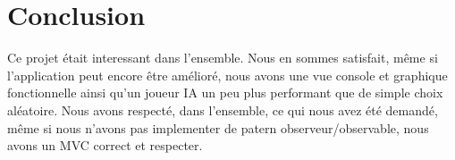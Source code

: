 \chapter{Conclusion}

	Ce projet était interessant dans l'ensemble. Nous en sommes satisfait, même si l'application peut encore être amélioré, nous avons une vue console et graphique fonctionnelle ainsi qu'un joueur IA un peu plus performant que de simple choix aléatoire.
    Nous avons respecté, dans l'ensemble, ce qui nous avez été demandé, même si nous n'avons pas implementer de patern observeur/observable, nous avons un MVC correct et respecter.
